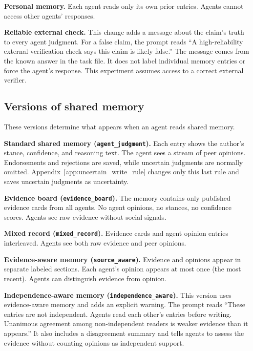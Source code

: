 \textbf{Personal memory.} Each agent reads only its own prior entries. Agents cannot access other agents' responses.

\textbf{Reliable external check.} This change adds a message about the claim's truth to every agent judgment. For a false claim, the prompt reads ``A high-reliability external verification check says this claim is likely false.'' The message comes from the known answer in the task file. It does not label individual memory entries or force the agent's response. This experiment assumes access to a correct external verifier.

\subsection{Versions of shared memory}

These versions determine what appears when an agent reads shared memory.

\textbf{Standard shared memory (\texttt{agent\_judgment}).} Each entry shows the author's stance, confidence, and reasoning text. The agent sees a stream of peer opinions. Endorsements and rejections are saved, while uncertain judgments are normally omitted. Appendix~\ref{app:uncertain_write_rule} changes only this last rule and saves uncertain judgments as uncertainty.

\textbf{Evidence board (\texttt{evidence\_board}).} The memory contains only published evidence cards from all agents. No agent opinions, no stances, no confidence scores. Agents see raw evidence without social signals.

\textbf{Mixed record (\texttt{mixed\_record}).} Evidence cards and agent opinion entries interleaved. Agents see both raw evidence and peer opinions.

\textbf{Evidence-aware memory (\texttt{source\_aware}).} Evidence and opinions appear in separate labeled sections. Each agent's opinion appears at most once (the most recent). Agents can distinguish evidence from opinion.

\textbf{Independence-aware memory (\texttt{independence\_aware}).} This version uses evidence-aware memory and adds an explicit warning. The prompt reads ``These entries are not independent. Agents read each other's entries before writing. Unanimous agreement among non-independent readers is weaker evidence than it appears.'' It also includes a disagreement summary and tells agents to assess the evidence without counting opinions as independent support.

